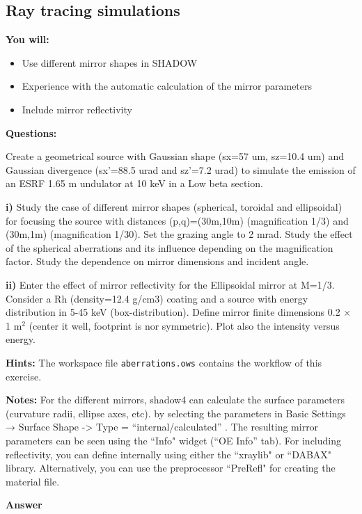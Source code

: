 \subsection{Ray tracing simulations}

\textbf{You will:}

\begin{itemize}
    \item Use different mirror shapes in SHADOW
    \item Experience with the automatic calculation of the mirror parameters
    \item Include mirror reflectivity
\end{itemize}

\textbf{Questions:}

Create a geometrical source with Gaussian shape (sx=57 um, sz=10.4 um) and Gaussian divergence (sx’=88.5 urad and sz’=7.2 urad) to simulate the emission of an ESRF 1.65 m undulator at 10 keV in a Low beta section.

\textbf{i)} Study the case of different mirror shapes (spherical, toroidal and ellipsoidal) for focusing the source with distances (p,q)=(30m,10m) (magnification 1/3) and (30m,1m) (magnification 1/30). Set the grazing angle to 2 mrad. Study the effect of the spherical aberrations and its influence depending on the magnification factor. 
Study the dependence on mirror dimensions and incident angle. 

\textbf{ii)} Enter the effect of mirror reflectivity for the Ellipsoidal mirror at M=1/3. Consider a Rh (density=12.4 g/cm3) coating and a source with energy distribution in 5-45 keV (box-distribution). 
Define mirror finite dimensions 0.2 $\times$ 1 m$^2$ (center it well, footprint is nor symmetric).
Plot also the intensity versus energy.

\textbf{Hints:} 
The workspace file {\tt aberrations.ows} contains the workflow of this exercise. 




\textbf{Notes:}
For the different mirrors, shadow4 can calculate the surface parameters (curvature radii, ellipse axes, etc). by selecting the parameters in Basic Settings → Surface Shape -> Type =  “internal/calculated” . The resulting mirror parameters can be seen using the ``Info" widget (“OE Info” tab). For including reflectivity, you can define internally using either the ``xraylib" or ``DABAX" library. Alternatively, you can use the preprocessor ``PreRefl" for creating the material file. 


\textbf{Answer}

